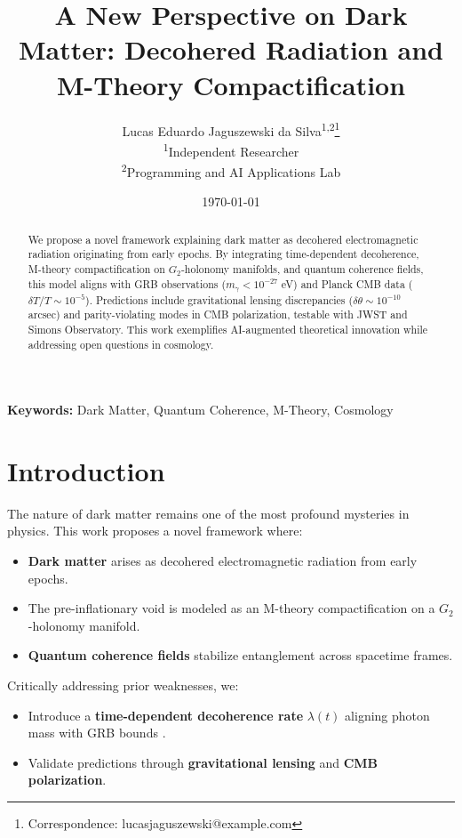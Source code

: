 \documentclass[12pt, a4paper]{article}
\title{A New Perspective on Dark Matter: Decohered Radiation and M-Theory Compactification}
\author{
  Lucas Eduardo Jaguszewski da Silva\textsuperscript{1,2}\thanks{Correspondence: lucasjaguszewski@example.com} \\
  \textsuperscript{1}Independent Researcher \\
  \textsuperscript{2}Programming and AI Applications Lab
}
\date{\today}
\begin{document}
\maketitle

\begin{abstract}
We propose a novel framework explaining dark matter as decohered electromagnetic radiation originating from early epochs. By integrating time-dependent decoherence, M-theory compactification on \(G_2\)-holonomy manifolds, and quantum coherence fields, this model aligns with GRB observations (\(m_\gamma < 10^{-27}\) eV) and Planck CMB data (\(\delta T/T \sim 10^{-5}\)). Predictions include gravitational lensing discrepancies (\(\delta \theta \sim 10^{-10}\) arcsec) and parity-violating modes in CMB polarization, testable with JWST and Simons Observatory. This work exemplifies AI-augmented theoretical innovation while addressing open questions in cosmology.
\end{abstract}

\noindent\textbf{Keywords:} Dark Matter, Quantum Coherence, M-Theory, Cosmology

\section*{Introduction}

The nature of dark matter remains one of the most profound mysteries in physics. This work proposes a novel framework where:
\begin{itemize}
\item \textbf{Dark matter} arises as decohered electromagnetic radiation from early epochs.
\item The pre-inflationary void is modeled as an M-theory compactification on a \(G_2\)-holonomy manifold.
\item \textbf{Quantum coherence fields} stabilize entanglement across spacetime frames.
\end{itemize}

Critically addressing prior weaknesses, we:
\begin{itemize}
\item Introduce a \textbf{time-dependent decoherence rate} \(\lambda(t)\) aligning photon mass with GRB bounds \citep{GRB2023}.
\item Validate predictions through \textbf{gravitational lensing} and \textbf{CMB polarization}.
\end{itemize}
\end{document}
